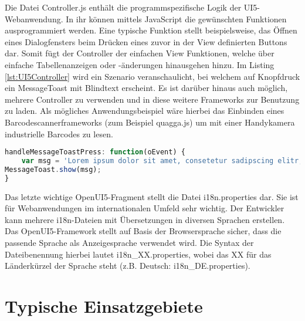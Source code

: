 Die Datei Controller.js enthält die programmspezifische Logik der UI5-Webanwendung. In ihr können mittels JavaScript die gewünschten Funktionen ausprogrammiert werden. Eine typische Funktion stellt beispielsweise, das Öffnen eines Dialogfensters beim Drücken eines zuvor in der View definierten Buttons dar. Somit fügt der Controller der einfachen View Funktionen, welche über einfache Tabellenanzeigen oder -änderungen hinausgehen hinzu. Im Listing \ref{lst:UI5Controller} wird ein Szenario veranschaulicht, bei welchem auf Knopfdruck ein MessageToast mit Blindtext erscheint. Es ist darüber hinaus auch möglich, mehrere Controller zu verwenden und in diese weitere Frameworks zur Benutzung zu laden. Als mögliches Anwendungsbeispiel wäre hierbei das Einbinden eines Barcodescannerframeworks (zum Beispiel quagga.js) um mit einer Handykamera industrielle Barcodes zu lesen. 

\begin{lstlisting}[caption=Beispiel OpenUI5 Controller, label=lst:UI5Controller, language=Javascript]
handleMessageToastPress: function(oEvent) {
	var msg = 'Lorem ipsum dolor sit amet, consetetur sadipscing elitr, sed diam nonumy\r\n eirmod.';
MessageToast.show(msg);
}
\end{lstlisting}

Das letzte wichtige OpenUI5-Fragment stellt die Datei i18n.properties dar. Sie ist für Webanwendungen im internationalen Umfeld sehr wichtig. Der Entwickler kann mehrere i18n-Dateien mit Übersetzungen in diversen Sprachen erstellen. Das OpenUI5-Framework stellt auf Basis der Browsersprache sicher, dass die passende Sprache als Anzeigesprache verwendet wird. Die Syntax der Dateibenennung hierbei lautet i18n\_XX.properties, wobei das XX für das Länderkürzel der Sprache steht (z.B. Deutsch: i18n\_DE.properties).\autocites[vgl.][126\psqq]{Antolovic2014}


\section{Typische Einsatzgebiete}


